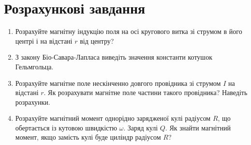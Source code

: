 \documentclass{LabWork}
\begin{document}
\section*{Розрахункові завдання}

\begin{enumerate}
	\item Розрахуйте магнітну індукцію поля на осі кругового витка зі струмом в його центрі і на відстані $r$ від центру?
	\item З закону Біо-Савара-Лапласа виведіть значення константи котушок Гельмгольца.
	\item Розрахуйте магнітне поле нескінченно довгого провідника зі струмом $I$ на відстані $r$. Як розрахувати магнітне поле частини такого провідника? Наведіть розрахунки.
	\item Розрахуйте магнітний момент однорідно зарядженої кулі радіусом $R$, що обертається із кутовою швидкістю $\omega$. Заряд кулі $Q$. Як знайти магнітний момент, якщо замість кулі буде циліндр радіусом $R$?
\end{enumerate}
\end{document}
